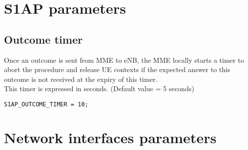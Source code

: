 \documentclass[a4paper,oneside]{report}
\begin{document}
\section{S1AP parameters}
\subsection{Outcome timer}
Once an outcome is sent from MME to eNB, the MME locally starts a timer to abort
the procedure and release UE contexts if the expected answer to this outcome is not
received at the expiry of this timer.\\
This timer is expressed in seconds. (Default value = 5 seconds)
\begin{lstlisting}
S1AP_OUTCOME_TIMER = 10;
\end{lstlisting}

\section{Network interfaces parameters}
\end{document}
